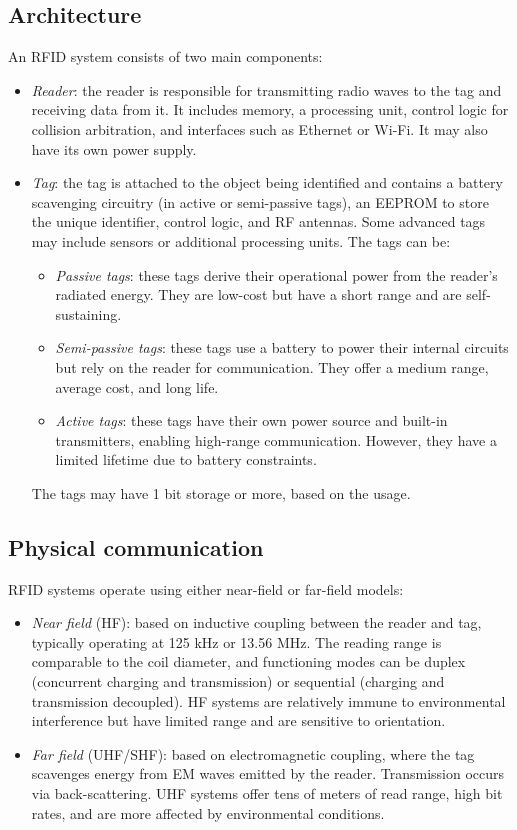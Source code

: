 \subsection{Architecture}
An RFID system consists of two main components:
\begin{itemize}
    \item \textit{Reader}: the reader is responsible for transmitting radio waves to the tag and receiving data from it. 
        It includes memory, a processing unit, control logic for collision arbitration, and interfaces such as Ethernet or Wi-Fi. 
        It may also have its own power supply.
    \item \textit{Tag}: the tag is attached to the object being identified and contains a battery scavenging circuitry (in active or semi-passive tags), an EEPROM to store the unique identifier, control logic, and RF antennas. 
        Some advanced tags may include sensors or additional processing units.
        The tags can be: 
        \begin{itemize}
            \item \textit{Passive tags}: these tags derive their operational power from the reader's radiated energy. 
                They are low-cost but have a short range and are self-sustaining.
            \item \textit{Semi-passive tags}: these tags use a battery to power their internal circuits but rely on the reader for communication. 
                They offer a medium range, average cost, and long life.
            \item \textit{Active tags}: these tags have their own power source and built-in transmitters, enabling high-range communication. 
                However, they have a limited lifetime due to battery constraints.
        \end{itemize}
        The tags may have 1 bit storage or more, based on the usage. 
\end{itemize}

\subsection{Physical communication}
RFID systems operate using either near-field or far-field models:
\begin{itemize}
    \item \textit{Near field} (HF): based on inductive coupling between the reader and tag, typically operating at 125 kHz or 13.56 MHz. 
        The reading range is comparable to the coil diameter, and functioning modes can be duplex (concurrent charging and transmission) or sequential (charging and transmission decoupled). 
        HF systems are relatively immune to environmental interference but have limited range and are sensitive to orientation.
    \item \textit{Far field} (UHF/SHF): based on electromagnetic coupling, where the tag scavenges energy from EM waves emitted by the reader.
        Transmission occurs via back-scattering. 
        UHF systems offer tens of meters of read range, high bit rates, and are more affected by environmental conditions.
\end{itemize}

